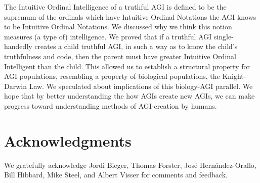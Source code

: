 \documentclass[runningheads]{llncs}
\begin{document}
The Intuitive Ordinal Intelligence of a truthful AGI is defined to be the supremum of the
ordinals which have Intuitive Ordinal Notations the AGI knows to be Intuitive Ordinal
Notations. We discussed why we think this notion measures (a type of) intelligence.
We proved that if a truthful AGI single-handedly creates
a child truthful AGI, in such a way as to know the child's truthfulness and code,
then the parent must have greater Intuitive Ordinal Intelligent than the child. This
allowed us to establish a structural property for AGI populations,
resembling a property of biological populations, the Knight-Darwin
Law. We speculated about implications of this biology-AGI parallel.
We hope that by better understanding
the how AGIs create new AGIs, we can make progress toward
understanding methods of AGI-creation by humans.

\section*{Acknowledgments}

We gratefully acknowledge Jordi Bieger, Thomas Forster, Jos{\'e} Hern{\'a}ndez-Orallo,
Bill Hibbard, Mike Steel,
and Albert Visser for comments and feedback.



\end{document}
